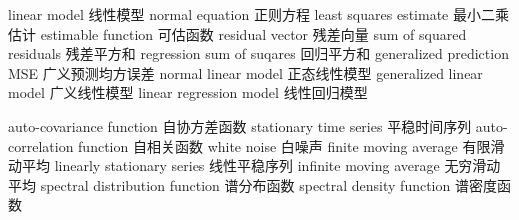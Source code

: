 {linear model} 
{线性模型}
{normal equation} 
{正则方程}
{least squares estimate} 
{最小二乘估计}
{estimable function} 
{可估函数}
{residual vector} 
{残差向量}
{sum of squared residuals} 
{残差平方和}
{regression sum of suqares} 
{回归平方和}
{generalized prediction MSE} 
{广义预测均方误差}
{normal linear model} 
{正态线性模型}
{generalized linear model} 
{广义线性模型}
{linear regression model} 
{线性回归模型}


{auto-covariance function} 
{自协方差函数}
{stationary time series} 
{平稳时间序列}
{auto-correlation function} 
{自相关函数}
{white noise} 
{白噪声}
{finite moving average} 
{有限滑动平均}
{linearly stationary series} 
{线性平稳序列}
{infinite moving average} 
{无穷滑动平均}
{spectral distribution function} 
{谱分布函数}
{spectral density function} 
{谱密度函数}


